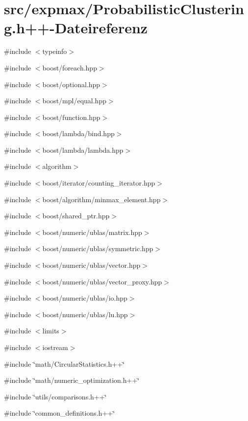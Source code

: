 \hypertarget{ProbabilisticClustering_8h_09_09}{
\section{src/expmax/ProbabilisticClustering.h++-\/Dateireferenz}
\label{ProbabilisticClustering_8h_09_09}
}
{\ttfamily \#include $<$typeinfo$>$}\par
{\ttfamily \#include $<$boost/foreach.hpp$>$}\par
{\ttfamily \#include $<$boost/optional.hpp$>$}\par
{\ttfamily \#include $<$boost/mpl/equal.hpp$>$}\par
{\ttfamily \#include $<$boost/function.hpp$>$}\par
{\ttfamily \#include $<$boost/lambda/bind.hpp$>$}\par
{\ttfamily \#include $<$boost/lambda/lambda.hpp$>$}\par
{\ttfamily \#include $<$algorithm$>$}\par
{\ttfamily \#include $<$boost/iterator/counting\_\-iterator.hpp$>$}\par
{\ttfamily \#include $<$boost/algorithm/minmax\_\-element.hpp$>$}\par
{\ttfamily \#include $<$boost/shared\_\-ptr.hpp$>$}\par
{\ttfamily \#include $<$boost/numeric/ublas/matrix.hpp$>$}\par
{\ttfamily \#include $<$boost/numeric/ublas/symmetric.hpp$>$}\par
{\ttfamily \#include $<$boost/numeric/ublas/vector.hpp$>$}\par
{\ttfamily \#include $<$boost/numeric/ublas/vector\_\-proxy.hpp$>$}\par
{\ttfamily \#include $<$boost/numeric/ublas/io.hpp$>$}\par
{\ttfamily \#include $<$boost/numeric/ublas/lu.hpp$>$}\par
{\ttfamily \#include $<$limits$>$}\par
{\ttfamily \#include $<$iostream$>$}\par
{\ttfamily \#include \char`\"{}math/CircularStatistics.h++\char`\"{}}\par
{\ttfamily \#include \char`\"{}math/numeric\_\-optimization.h++\char`\"{}}\par
{\ttfamily \#include \char`\"{}utils/comparisons.h++\char`\"{}}\par
{\ttfamily \#include \char`\"{}common\_\-definitions.h++\char`\"{}}\par
